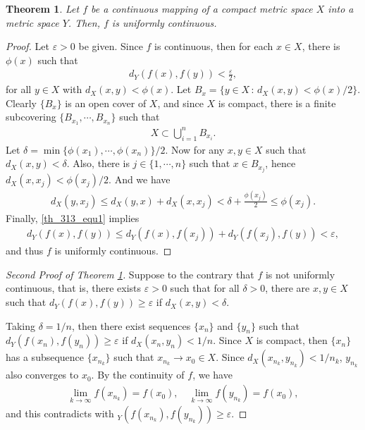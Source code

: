 \documentclass[10pt]{book}
\newtheorem{theorem}{Theorem}[chapter]
\theoremstyle{definition}
\numberwithin{equation}{chapter}
\begin{document}
\begin{theorem}\label{th_313}
Let $f$ be a continuous mapping of a compact metric space $X$ into a metric space $Y$. Then, $f$ is uniformly continuous.
\end{theorem}
\begin{proof}
Let $\varepsilon > 0$ be given. Since $f$ is continuous, then for each $x \in X$, there is $\phi(x)$ such that
\begin{align}\label{th_313_equ1}
    d_Y(f(x),f(y)) < \frac{\varepsilon}{2},
\end{align}
for all $y \in X$ with $d_X(x,y) < \phi(x)$. Let $B_x = \{y \in X \,:\, d_X(x,y) < \phi(x)/2\}$. Clearly $\{B_x\}$ is an open cover of $X$, and since $X$ is compact, there is a finite subcovering $\{B_{x_1}, \cdots, B_{x_n}\}$ such that 
\begin{align*}
    X \subset \bigcup^n_{i=1} B_{x_i}.
\end{align*}
Let $\delta = \min\{\phi(x_1), \cdots, \phi(x_n)\}/2$. Now for any $x,y \in X$ such that $d_X(x,y) < \delta$. Also, there is $j \in \{1,\cdots,n\}$ such that $x \in B_{x_j}$, hence $d_X(x,x_j) < \phi(x_j)/2$. And we have
\begin{align*}
    d_X(y, x_j) \leq d_X(y,x) + d_X(x, x_j) < \delta + \frac{\phi(x_j)}{2} \leq \phi(x_j).
\end{align*}
Finally, \eqref{th_313_equ1} implies
\begin{align*}
    d_Y(f(x),f(y)) \leq d_Y(f(x), f(x_j)) + d_Y(f(x_j), f(y)) < \varepsilon,
\end{align*}
and thus $f$ is uniformly continuous.
\end{proof}



\begin{proof}[Second Proof of Theorem \ref{th_313}]
Suppose to the contrary that $f$ is not uniformly continuous, that is, there exists $\varepsilon > 0$ such that for all $\delta > 0$, there are $x,y \in X$ such that $d_Y(f(x),f(y)) \geq \varepsilon$ if $d_X(x,y) < \delta$. 

Taking $\delta = 1/n$, then there exist sequences $\{x_n\}$ and $\{y_n\}$ such that $d_Y(f(x_n),f(y_n)) \geq \varepsilon$ if $d_X(x_n,y_n) < 1/n$. Since $X$ is compact, then $\{x_n\}$ has a subsequence $\{x_{n_k}\}$ such that $x_{n_k} \to x_0 \in X$. Since $d_X(x_{n_k},y_{n_k}) < 1/n_k$, $y_{n_k}$ also converges to $x_0$. By the continuity of $f$, we have 
\begin{align*}
    \lim_{k\to\infty} f(x_{n_k}) = f(x_0), \quad \lim_{k\to\infty} f(y_{n_k}) = f(x_0),
\end{align*}
and this contradicts with $_Y(f(x_{n_k}),f(y_{n_k})) \geq \varepsilon$.
\end{proof}
\end{document}
